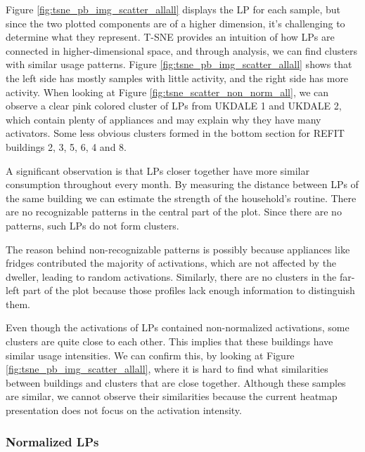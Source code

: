 Figure \ref{fig:tsne_pb_img_scatter_allall} displays the LP for each sample, but since the two plotted components are of a higher dimension, it's challenging to determine what they represent. 
T-SNE provides an intuition of how LPs are connected in higher-dimensional space, and through analysis, we can find clusters with similar usage patterns.
Figure \ref{fig:tsne_pb_img_scatter_allall} shows that the left side has mostly samples with little activity, and the right side has more activity.
When looking at Figure \ref{fig:tsne_scatter_non_norm_all}, we can observe a clear pink colored cluster of LPs from UKDALE 1 and UKDALE 2, which contain plenty of appliances and may explain why they have many activators.
Some less obvious clusters formed in the bottom section for REFIT buildings 2, 3, 5, 6, 4 and 8. 

A significant observation is that LPs closer together have more similar consumption throughout every month.
By measuring the distance between LPs of the same building we can estimate the strength of the household's routine. 
There are no recognizable patterns in the central part of the plot. 
Since there are no patterns, such LPs do not form clusters. 

The reason behind non-recognizable patterns is possibly because appliances like fridges contributed the majority of activations, which are not affected by the dweller, leading to random activations.
Similarly, there are no clusters in the far-left part of the plot because those profiles lack enough information to distinguish them. 

Even though the activations of LPs contained non-normalized activations, some clusters are quite close to each other.
This implies that these buildings have similar usage intensities.
We can confirm this, by looking at Figure \ref{fig:tsne_pb_img_scatter_allall},
where it is hard to find what similarities between buildings and clusters that are close together.
Although these samples are similar, we cannot observe their similarities because the current heatmap presentation does not focus on the activation intensity.


\subsubsection{Normalized LPs}

